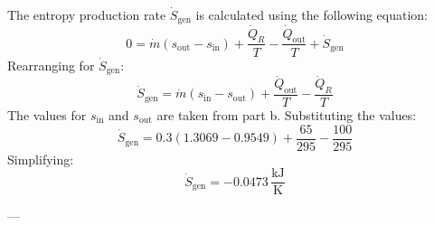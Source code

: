 The entropy production rate \( \dot{S}_{\text{gen}} \) is calculated using the following equation:  
\[
0 = \dot{m} (s_{\text{out}} - s_{\text{in}}) + \frac{\dot{Q}_R}{T} - \frac{\dot{Q}_{\text{out}}}{T} + \dot{S}_{\text{gen}}
\]  
Rearranging for \( \dot{S}_{\text{gen}} \):  
\[
\dot{S}_{\text{gen}} = \dot{m} (s_{\text{in}} - s_{\text{out}}) + \frac{\dot{Q}_{\text{out}}}{T} - \frac{\dot{Q}_R}{T}
\]  
The values for \( s_{\text{in}} \) and \( s_{\text{out}} \) are taken from part b. Substituting the values:  
\[
\dot{S}_{\text{gen}} = 0.3 (1.3069 - 0.9549) + \frac{65}{295} - \frac{100}{295}
\]  
Simplifying:  
\[
\dot{S}_{\text{gen}} = -0.0473 \, \frac{\text{kJ}}{\text{K}}
\]  

---